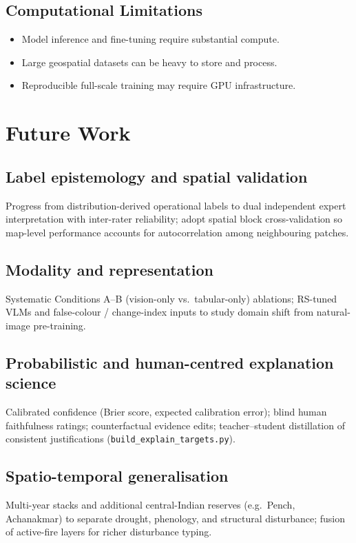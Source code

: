 \documentclass[11pt]{article}
\begin{document}
\subsection{Computational Limitations}
\begin{itemize}
    \item Model inference and fine-tuning require substantial compute.
    \item Large geospatial datasets can be heavy to store and process.
    \item Reproducible full-scale training may require GPU infrastructure.
\end{itemize}

\section{Future Work}
\subsection{Label epistemology and spatial validation}
Progress from distribution-derived operational labels to dual independent expert interpretation with inter-rater reliability; adopt spatial block cross-validation so map-level performance accounts for autocorrelation among neighbouring patches.

\subsection{Modality and representation}
Systematic Conditions A--B (vision-only vs.\ tabular-only) ablations; RS-tuned VLMs and false-colour / change-index inputs to study domain shift from natural-image pre-training.

\subsection{Probabilistic and human-centred explanation science}
Calibrated confidence (Brier score, expected calibration error); blind human faithfulness ratings; counterfactual evidence edits; teacher--student distillation of consistent justifications (\texttt{build\_explain\_targets.py}).

\subsection{Spatio-temporal generalisation}
Multi-year stacks and additional central-Indian reserves (e.g.\ Pench, Achanakmar) to separate drought, phenology, and structural disturbance; fusion of active-fire layers for richer disturbance typing.
\end{document}
